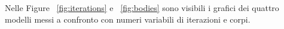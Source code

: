 Nelle Figure ~\ref{fig:iterations} e ~\ref{fig:bodies} sono visibili i grafici dei quattro modelli messi a confronto con numeri variabili di iterazioni e corpi.

\begin{figure}[ht]
    \begin{center}
        \begin{minipage}{.5\linewidth}
            \centering
        \end{minipage}%
        \begin{minipage}{.5\linewidth}
            \centering
        \end{minipage}\par\medskip

\end{center}
\end{figure}
